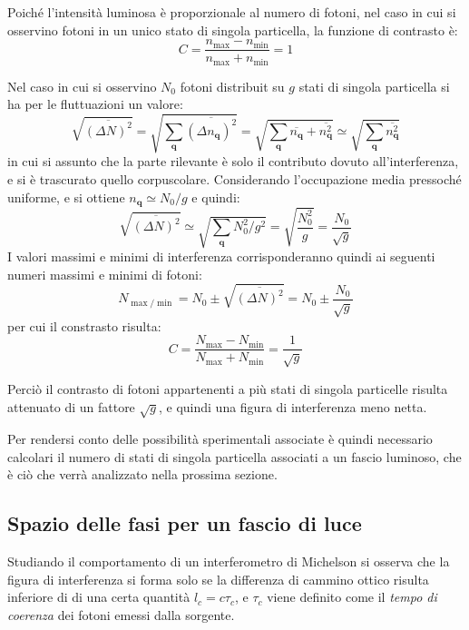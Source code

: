 Poiché l'intensità luminosa è proporzionale al numero di fotoni, nel caso in cui si osservino fotoni in un unico stato di singola particella, la funzione di contrasto è:
\begin{equation*}
C = \frac{n_{\max} - n_{\min}}{n_{\max} + n_{\min}} = 1
\end{equation*}
\newline

Nel caso in cui si osservino $ N_0 $ fotoni distribuit su $ g $ stati di singola particella si ha per le fluttuazioni un valore:
\[ \sqrt{\overline{(\Delta N)^2}} = \sqrt{\sum_{\textbf{q}} \overline{(\Delta n_{\textbf{q}})^2}} = \sqrt{\sum_{\textbf{q}} \overline{n_{\textbf{q}}} +  \overline{n_{\textbf{q}}^2}} \simeq \sqrt{\sum_{\textbf{q}}  \overline{n_{\textbf{q}}^2}} \]
in cui si assunto che la parte rilevante è solo il contributo dovuto all'interferenza, e si è trascurato quello corpuscolare. Considerando l'occupazione media pressoché uniforme, e si ottiene $ n_{\textbf{q}} \simeq N_0/g$ e quindi:
\[  \sqrt{\overline{(\Delta N)^2}} \simeq \sqrt{\sum_{\textbf{q}}  N_0^2/g^2} = \sqrt{\frac{N_0^2}{g}} = \frac{N_0}{\sqrt{g}} \]
I valori massimi e minimi di interferenza corrisponderanno quindi ai seguenti numeri massimi e minimi di fotoni:
\[  N_{\max/\min} = N_0 \pm \sqrt{\overline{(\Delta N)^2}} = N_0 \pm \frac{N_0}{\sqrt{g}} \]
per cui il constrasto risulta:
\[ C = \frac{N_{\max} - N_{\min}}{N_{\max} + N_{\min}} = \frac{1}{\sqrt{g}}\]

Perciò il contrasto di fotoni appartenenti a più stati di singola particelle risulta attenuato di un fattore $ \sqrt{g} $, e quindi una figura di interferenza meno netta.

Per rendersi conto delle possibilità sperimentali associate è quindi necessario calcolari il numero di stati di singola particella associati a un fascio luminoso, che è ciò che verrà analizzato nella prossima sezione.

\subsection{Spazio delle fasi per un fascio di luce}

Studiando il comportamento di un interferometro di Michelson si osserva che la figura di interferenza si forma solo se la differenza di cammino ottico risulta inferiore di di una certa quantità $ l_c = c \tau_c $, e $ \tau_c $  viene definito come il \textit{tempo di coerenza} dei fotoni emessi dalla sorgente.

